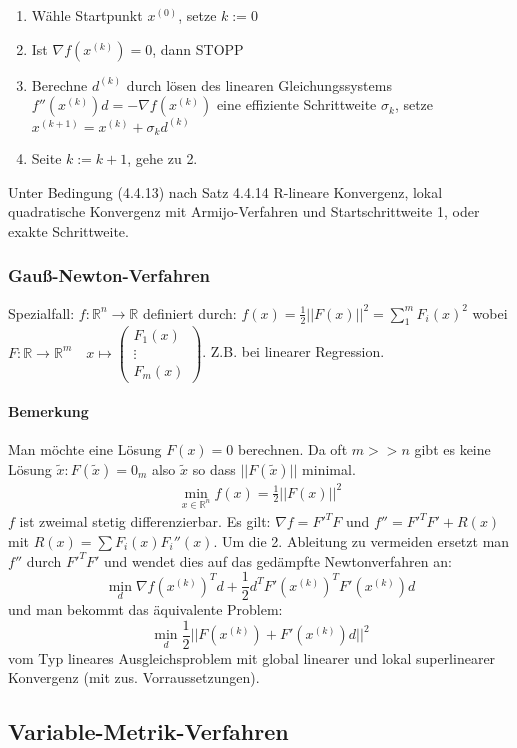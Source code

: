\documentclass[ngerman,halfparskip]{scrartcl}
\theoremstyle{definition}
\def\R{\mathbb R}
\begin{document}
\begin{enumerate}
\item Wähle Startpunkt $x^{(0)}$, setze $k:=0$
\item Ist $\nabla f(x^{(k)})=0$, dann STOPP
\item Berechne $d^{(k)}$ durch lösen des linearen Gleichungssystems $f''(x^{(k)})d=-\nabla f(x^{(k)})$ eine effiziente Schrittweite $\sigma_k$, setze $x^{(k+1)}=x^{(k)}+\sigma_kd^{(k)}$
\item Seite $k:=k+1$, gehe zu 2.
\end{enumerate}

Unter Bedingung (4.4.13) nach Satz 4.4.14 R-lineare Konvergenz, lokal quadratische Konvergenz mit Armijo-Verfahren und Startschrittweite 1, oder exakte Schrittweite.

\subsubsection*{Gauß-Newton-Verfahren} 
Spezialfall: $f:\R^n\to \R$ definiert durch: $f(x)=\frac 12 ||F(x)||^2=\sum\limits_1^mF_i(x)^2$ wobei $F:\R\to\R^m \quad x\mapsto \begin{pmatrix}
F_1(x)\\ \vdots \\ F_m(x)
\end{pmatrix}$. Z.B. bei linearer Regression. 

\paragraph{Bemerkung} Man möchte eine Lösung $F(x)=0$ berechnen. Da oft $m>>n$ gibt es keine Lösung $\tilde x: F(\tilde x)=0_m$ also $\tilde x$ so dass $||F(\tilde x)||$ minimal. 
\begin{gather*}\tag{4.7.7}
\min\limits_{x\in\R^n}f(x)=\frac 12 || F(x)||^2
\end{gather*}
$f$ ist zweimal stetig differenzierbar. Es gilt: $\nabla f=F'^TF$ und $f''=F'^TF'+R(x)$ mit $R(x)=\sum F_i(x)F_i''(x)$. Um die 2. Ableitung zu vermeiden ersetzt man $f''$ durch $F'^TF'$ und wendet dies auf das gedämpfte Newtonverfahren an: $$\min_d \nabla f(x^{(k)})^Td+\frac 12 d^TF'(x^{(k)})^TF'(x^{(k)})d$$ und man bekommt das äquivalente Problem: $$\min_d \frac 12 ||F(x^{(k)})+F'(x^{(k)})d||^2$$ vom Typ lineares Ausgleichsproblem mit global linearer und lokal superlinearer Konvergenz (mit zus. Vorraussetzungen).

\subsection*{Variable-Metrik-Verfahren}
\end{document}
